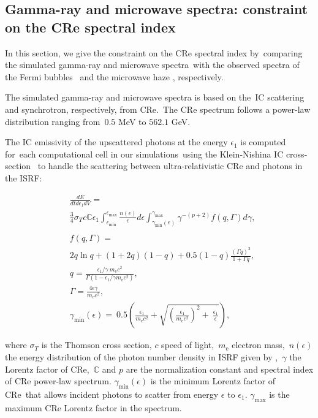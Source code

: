\documentclass[fleqn,usenatbib,useAMS]{mnras}
\begin{document}
\subsection{Gamma-ray and microwave spectra: constraint on the CRe spectral index}
\label{sec:gamma-ray-microwave}
In this section, we give the constraint on the CRe spectral index by\
comparing the simulated gamma-ray and microwave spectra\
with the observed spectra of the Fermi bubbles \citep{Ackermann2014}\
and the microwave haze \citep{Dobler_2008}, respectively.\

The simulated gamma-ray and microwave spectra is based on the\
IC scattering and synchrotron, respectively, from CRe.\
The CRe spectrum follows a power-law distribution ranging from\
$0.5$ MeV to $562.1$ GeV.


The IC emissivity of the upscattered photons at the energy $\epsilon_{1}$ is computed for\
each computational cell in our simulations\
using the Klein-Nishina IC cross-section \citep{Jones1968,BLUMENTHAL1970}\
to handle the scattering between ultra-relativistic CRe and photons in the ISRF:

\begin{subequations}
  \begin{align}
  &\frac{dE}{dtd\epsilon_{1}dV} =\nonumber\\
               &\frac{3}{4}\sigma_{T}c\mathbb{C}\epsilon_{1}\int^{\epsilon_{\text{max}}}_{\epsilon_{\text{min}}}
               \frac{n(\epsilon)}{\epsilon}d\epsilon\int^{\gamma_{\text{max}}}_{\gamma_{\text{min}}\left(\epsilon\right)}
               \gamma^{-(p+2)}f(q, \Gamma)d\gamma,\\
  \nonumber\\
  &f(q, \Gamma) =\nonumber\\
               &2q\ln q+(1+2q)(1-q)+0.5(1-q)\frac{\left(\Gamma q\right)^2}{1+\Gamma q},\\
  &q=\frac{\epsilon_{1}/\gamma\
               m_{\text{e}}c^{2}}{\Gamma\left(1-\epsilon_{1}/\gamma m_{\text{e}}c^{2}\right)},\\
  &\Gamma=\frac{4\epsilon \gamma}{m_{\text{e}}c^2},\\
  &\gamma_{\text{min}}(\epsilon)=\
   0.5\left(\frac{\epsilon_{1}}{m_{\text{e}}c^2}+\sqrt{\left(\frac{\epsilon_{1}}{m_{\text{e}}c^2}\right)^2+\
   \frac{\epsilon_{1}}{\epsilon}}\right) \label{gamma-min},
  \end{align}
\label{gammaray-emissivity}
\end{subequations}

where $\sigma_{T}$ is the Thomson cross section, $c$ speed of light,\
$m_{\text{e}}$ electron mass,\
$n(\epsilon)$ the energy distribution of the photon number density in ISRF given by \citet{Porter2017},\
$\gamma$ the Lorentz factor of CRe,\
$\mathbb{C}$ and $p$ are the normalization constant and spectral index of CRe power-law spectrum.
$\gamma_{\text{min}}(\epsilon)$ is the minimum Lorentz factor of CRe\
that allows incident photons to scatter from energy $\epsilon$ to $\epsilon_{1}$.
$\gamma_{\text{max}}$ is the maximum CRe Lorentz factor in the spectrum.
\end{document}

